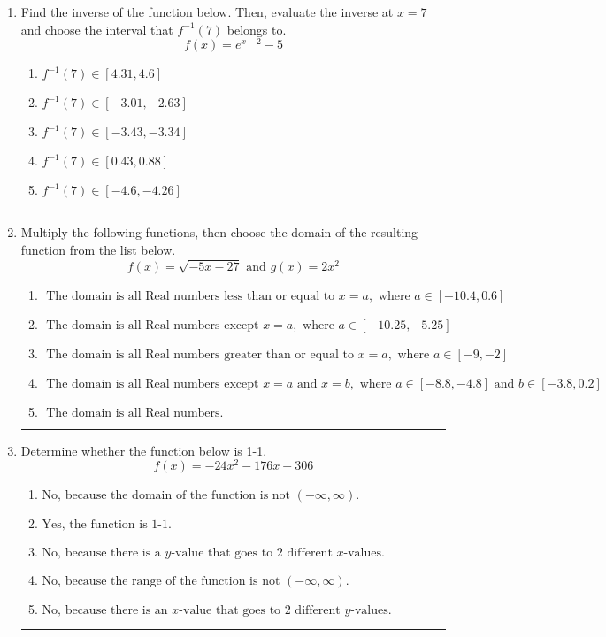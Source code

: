 \documentclass[14pt]{extbook}
\newcommand{\litem}[1]{\item#1\hspace*{-1cm}\rule{\textwidth}{0.4pt}}
\begin{document}
\begin{enumerate}
{\begin{enumerate}[label=\Alph*.]
\end{enumerate} }
\litem{
Find the inverse of the function below. Then, evaluate the inverse at $x = 7$ and choose the interval that $f^{-1}(7)$ belongs to.\[ f(x) = e^{x-2}-5 \]\begin{enumerate}[label=\Alph*.]
\item \( f^{-1}(7) \in [4.31, 4.6] \)
\item \( f^{-1}(7) \in [-3.01, -2.63] \)
\item \( f^{-1}(7) \in [-3.43, -3.34] \)
\item \( f^{-1}(7) \in [0.43, 0.88] \)
\item \( f^{-1}(7) \in [-4.6, -4.26] \)

\end{enumerate} }
\litem{
Multiply the following functions, then choose the domain of the resulting function from the list below.\[ f(x) = \sqrt{-5x-27}  \text{ and } g(x) = 2x^{2} \]\begin{enumerate}[label=\Alph*.]
\item \( \text{ The domain is all Real numbers less than or equal to } x = a, \text{ where } a \in [-10.4, 0.6] \)
\item \( \text{ The domain is all Real numbers except } x = a, \text{ where } a \in [-10.25, -5.25] \)
\item \( \text{ The domain is all Real numbers greater than or equal to } x = a, \text{ where } a \in [-9, -2] \)
\item \( \text{ The domain is all Real numbers except } x = a \text{ and } x = b, \text{ where } a \in [-8.8, -4.8] \text{ and } b \in [-3.8, 0.2] \)
\item \( \text{ The domain is all Real numbers. } \)

\end{enumerate} }
\litem{
Determine whether the function below is 1-1.\[ f(x) = -24 x^2 - 176 x - 306 \]\begin{enumerate}[label=\Alph*.]
\item \( \text{No, because the domain of the function is not $(-\infty, \infty)$.} \)
\item \( \text{Yes, the function is 1-1.} \)
\item \( \text{No, because there is a $y$-value that goes to 2 different $x$-values.} \)
\item \( \text{No, because the range of the function is not $(-\infty, \infty)$.} \)
\item \( \text{No, because there is an $x$-value that goes to 2 different $y$-values.} \)

\end{enumerate} }
\end{enumerate}
\end{document}
